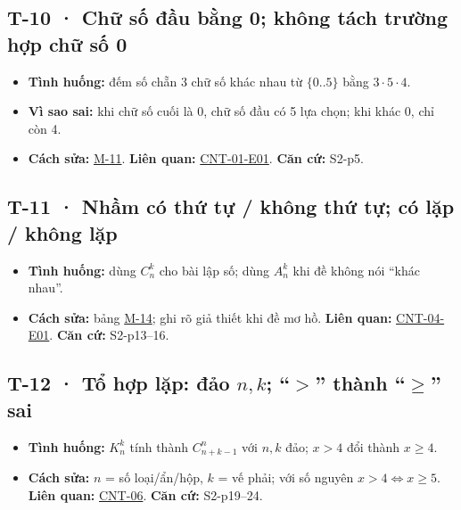 \documentclass[
  10pt,
  twoside,openany]{book}
\providecommand{\tightlist}{%
  \setlength{\itemsep}{0pt}\setlength{\parskip}{0pt}}
\begin{document}
\hypertarget{T-10}{%
\subsection{T-10 · Chữ số đầu bằng 0; không tách trường hợp chữ số
0}\label{T-10}}

\begin{itemize}
\tightlist
\item
  \textbf{Tình huống:} đếm số chẵn 3 chữ số khác nhau từ \(\{0..5\}\)
  bằng \(3\cdot5\cdot4\).
\item
  \textbf{Vì sao sai:} khi chữ số cuối là 0, chữ số đầu có 5 lựa chọn;
  khi khác 0, chỉ còn 4.
\item
  \textbf{Cách sửa:} \protect\hyperlink{M-11}{M-11}. \textbf{Liên quan:}
  \protect\hyperlink{CNT-01-E01}{CNT-01-E01}. \textbf{Căn cứ:} S2-p5.
\end{itemize}

\hypertarget{T-11}{%
\subsection{T-11 · Nhầm có thứ tự / không thứ tự; có lặp / không
lặp}\label{T-11}}

\begin{itemize}
\tightlist
\item
  \textbf{Tình huống:} dùng \(C_n^k\) cho bài lập số; dùng \(A_n^k\) khi
  đề không nói ``khác nhau''.
\item
  \textbf{Cách sửa:} bảng \protect\hyperlink{M-14}{M-14}; ghi rõ giả
  thiết khi đề mơ hồ. \textbf{Liên quan:}
  \protect\hyperlink{CNT-04-E01}{CNT-04-E01}. \textbf{Căn cứ:}
  S2-p13--16.
\end{itemize}

\hypertarget{T-12}{%
\subsection{\texorpdfstring{T-12 · Tổ hợp lặp: đảo \(n,k\); ``\(>\)''
thành ``\(\ge\)''
sai}{T-12 · Tổ hợp lặp: đảo n,k; ``\textgreater'' thành ``\textbackslash ge'' sai}}\label{T-12}}

\begin{itemize}
\tightlist
\item
  \textbf{Tình huống:} \(K_n^k\) tính thành \(C_{n+k-1}^{n}\) với
  \(n,k\) đảo; \(x>4\) đổi thành \(x\ge4\).
\item
  \textbf{Cách sửa:} \(n\) = số loại/ẩn/hộp, \(k\) = vế phải; với số
  nguyên \(x>4\Leftrightarrow x\ge5\). \textbf{Liên quan:}
  \protect\hyperlink{CNT-06}{CNT-06}. \textbf{Căn cứ:} S2-p19--24.
\end{itemize}
\end{document}
